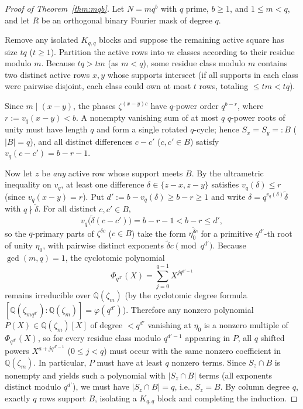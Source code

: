 \documentclass[11pt,reqno]{amsart}
\numberwithin{equation}{section}
\theoremstyle{definition}
\theoremstyle{remark}
\newcommand{\Q}{\mathbb{Q}}
\begin{document}
\begin{proof}[Proof of Theorem~\ref{thm:mqb}]
Let $N=mq^b$ with $q$ prime, $b\ge 1$, and $1\le m<q$, and let $R$ be an orthogonal binary Fourier mask of degree $q$.

Remove any isolated $K_{q,q}$ blocks and suppose the remaining active square has size $tq$ ($t\ge 1$). Partition the active rows into $m$ classes according to their residue modulo $m$. Because $tq > tm$ (as $m<q$), some residue class modulo $m$ contains two distinct active rows $x,y$ whose supports intersect (if all supports in each class were pairwise disjoint, each class could own at most $t$ rows, totaling $\le tm < tq$).

Since $m\mid (x-y)$, the phases $\zeta^{(x-y)c}$ have $q$-power order $q^{b-r}$, where $r := v_q(x-y) < b$. A nonempty vanishing sum of at most $q$ $q$-power roots of unity must have length $q$ and form a single rotated $q$-cycle; hence $S_x = S_y =: B$ ($|B|=q$), and all distinct differences $c-c'$ ($c,c'\in B$) satisfy $v_q(c-c') = b-r-1$.

Now let $z$ be \emph{any} active row whose support meets $B$. By the ultrametric inequality on $v_q$, at least one difference $\delta\in\{z-x, z-y\}$ satisfies $v_q(\delta)\le r$ (since $v_q(x-y)=r$). Put $d' := b - v_q(\delta) \ge b - r \ge 1$ and write $\delta = q^{v_q(\delta)}\tilde{\delta}$ with $q\nmid \tilde{\delta}$. For all distinct $c,c'\in B$,
\[
v_q\bigl(\tilde{\delta}(c-c')\bigr) = b - r - 1 < b - r \le d',
\]
so the $q$-primary parts of $\zeta^{\delta c}$ ($c\in B$) take the form $\eta_0^{\tilde{\delta}c}$ for a primitive $q^{d'}$-th root of unity $\eta_0$, with pairwise distinct exponents $\tilde{\delta}c \pmod{q^{d'}}$.
Because $\gcd(m,q)=1$, the cyclotomic polynomial
\[
\Phi_{q^{d'}}(X) = \sum_{j=0}^{q-1} X^{j q^{d'-1}}
\]
remains irreducible over $\Q(\zeta_m)$ (by the cyclotomic degree formula $[\Q(\zeta_{mq^{d'}}):\Q(\zeta_m)]=\varphi(q^{d'})$). Therefore any nonzero polynomial $P(X)\in\Q(\zeta_m)[X]$ of degree $<q^{d'}$ vanishing at $\eta_0$ is a nonzero multiple of $\Phi_{q^{d'}}(X)$, so for every residue class modulo $q^{d'-1}$ appearing in $P$, all $q$ shifted powers $X^{a + j q^{d'-1}}$ ($0\le j<q$) must occur with the same nonzero coefficient in $\Q(\zeta_m)$. In particular, $P$ must have at least $q$ nonzero terms. Since $S_z\cap B$ is nonempty and yields such a polynomial with $|S_z\cap B|$ terms (all exponents distinct modulo $q^{d'}$), we must have $|S_z\cap B|=q$, i.e., $S_z=B$. By column degree $q$, exactly $q$ rows support $B$, isolating a $K_{q,q}$ block and completing the induction.


\end{proof}
\end{document}
